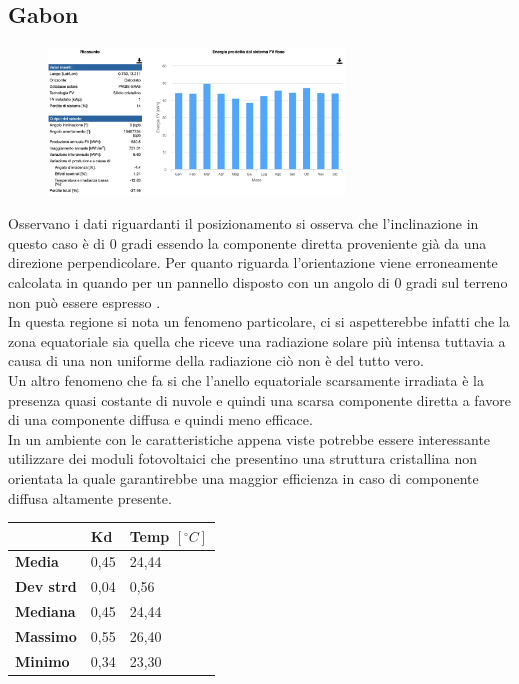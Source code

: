 \subsection{Gabon}
\begin{figure}[H]
    \centering
    \includegraphics[width=0.7\textwidth]{res/cap 5/impianto gabon}
\end{figure}\noindent
Osservano i dati riguardanti il posizionamento si osserva che l'inclinazione in questo caso è di 0 gradi essendo la componente diretta proveniente già da una direzione perpendicolare. Per quanto riguarda l'orientazione viene erroneamente calcolata in quando per un pannello disposto con un angolo di 0 gradi sul terreno non può essere espresso .\\
In questa regione si nota un fenomeno particolare, ci si aspetterebbe infatti che la zona equatoriale sia quella che riceve una radiazione solare più intensa tuttavia a causa di una non uniforme della radiazione ciò non è del tutto vero.\\
Un altro fenomeno che fa si che l'anello equatoriale scarsamente irradiata è la presenza quasi costante di nuvole e quindi una scarsa componente diretta a favore di una componente diffusa e quindi meno efficace.\\
In un ambiente con le caratteristiche appena viste potrebbe essere interessante utilizzare dei moduli fotovoltaici che presentino una struttura cristallina non orientata la quale garantirebbe una maggior efficienza in caso di componente diffusa altamente presente.
\begin{table}[H]
    \centering
    \begin{tabular}{|l|l|l|}
    \hline	
          & \textbf{Kd} & \textbf{Temp $[{}^\circ C]$} \\ \hline
        \textbf{Media} & 0,45 & 24,44 \\ \hline
        \textbf{Dev strd} & 0,04 & 0,56 \\ \hline
        \textbf{Mediana} & 0,45 & 24,44 \\ \hline
        \textbf{Massimo} & 0,55 & 26,40 \\ \hline
        \textbf{Minimo} & 0,34 & 23,30 \\ \hline
    \end{tabular}
\end{table}
